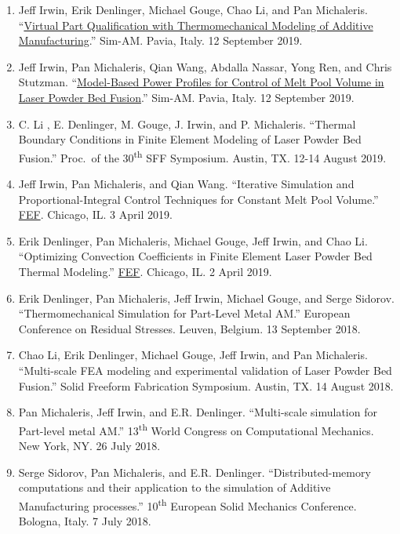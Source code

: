 \documentclass[10.5pt,letterpaper]{article}
\begin{document}
\begin{enumerate}[leftmargin=*]
	\setlength{\parskip}{0em}
	\item Jeff Irwin, Erik Denlinger, Michael Gouge, Chao Li, and Pan Michaleris.  ``\href{http://congress.cimne.com/sim-am2019/frontal/Doc/IndustrialWorkshops/Autodesk.pdf}{Virtual Part Qualification with Thermomechanical Modeling of Additive Manufacturing}.'' Sim-AM.  Pavia, Italy.  12 September 2019.
	\item Jeff Irwin, Pan Michaleris, Qian Wang,  Abdalla  Nassar, Yong Ren, and Chris Stutzman.  ``\href{http://congress.cimne.com/sim-am2019/admin/files/fileabstract/a464.pdf}{Model-Based Power Profiles for Control of Melt Pool Volume in Laser Powder Bed Fusion}.'' Sim-AM.  Pavia, Italy.  12 September 2019.
	\item C. Li , E. Denlinger, M. Gouge, J. Irwin, and P. Michaleris. ``Thermal Boundary Conditions in Finite Element Modeling of Laser Powder Bed Fusion.'' Proc.\ of the 30\textsuperscript{th} SFF Symposium. Austin, TX.  12-14 August 2019.
	\item Jeff Irwin, Pan Michaleris, and Qian Wang.  ``Iterative Simulation and Proportional-Integral Control Techniques for Constant Melt Pool Volume.''  \href{http://www.fef2019.org/}{FEF}.  Chicago, IL.  3 April 2019.
	\item Erik Denlinger, Pan Michaleris, Michael Gouge, Jeff Irwin, and Chao Li.  ``Optimizing Convection Coefficients in Finite Element Laser Powder Bed Thermal Modeling.''  \href{http://www.fef2019.org/}{FEF}.  Chicago, IL.  2 April 2019.
	\item Erik Denlinger, Pan Michaleris, Jeff Irwin, Michael Gouge, and Serge Sidorov.  ``Thermomechanical Simulation for Part-Level Metal AM.''  European Conference on Residual Stresses.  Leuven, Belgium.  13 September 2018.
	\item Chao Li, Erik Denlinger, Michael Gouge, Jeff Irwin, and Pan Michaleris.  ``Multi-scale FEA modeling and experimental validation of Laser Powder Bed Fusion.'' Solid Freeform Fabrication Symposium.  Austin, TX. 14 August 2018.
	\item Pan Michaleris, Jeff Irwin, and E.R. Denlinger.  ``Multi-scale simulation for Part-level metal AM.''  13\textsuperscript{th} World Congress on Computational Mechanics.  New York, NY.  26 July 2018.
	\item Serge Sidorov, Pan Michaleris, and E.R. Denlinger.  ``Distributed-memory computations and their application to the simulation of Additive Manufacturing processes.''  10\textsuperscript{th} European Solid Mechanics Conference.  Bologna, Italy.  7 July 2018.

\end{enumerate}
\end{document}

